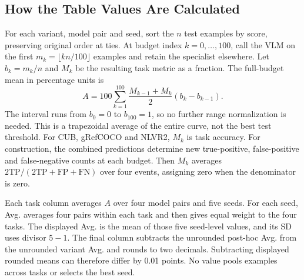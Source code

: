 \subsection{How the Table Values Are Calculated}
For each variant, model pair and seed, sort the $n$ test examples by score, preserving original order at ties. At budget index $k=0,\ldots,100$, call the VLM on the first $m_k=\lfloor kn/100\rfloor$ examples and retain the specialist elsewhere. Let $b_k=m_k/n$ and $M_k$ be the resulting task metric as a fraction. The full-budget mean in percentage units is
\[
A=100\sum_{k=1}^{100}\frac{M_{k-1}+M_k}{2}(b_k-b_{k-1}).
\]
The interval runs from $b_0=0$ to $b_{100}=1$, so no further range normalization is needed. This is a trapezoidal average of the entire curve, not the best test threshold. For CUB, gRefCOCO and NLVR2, $M_k$ is task accuracy. For construction, the combined predictions determine new true-positive, false-positive and false-negative counts at each budget. Then $M_k$ averages $2\mathrm{TP}/(2\mathrm{TP}+\mathrm{FP}+\mathrm{FN})$ over four events, assigning zero when the denominator is zero.

Each task column averages $A$ over four model pairs and five seeds. For each seed, Avg. averages four pairs within each task and then gives equal weight to the four tasks. The displayed Avg. is the mean of those five seed-level values, and its SD uses divisor $5-1$. The final column subtracts the unrounded post-hoc Avg. from the unrounded variant Avg. and rounds to two decimals. Subtracting displayed rounded means can therefore differ by 0.01 points. No value pools examples across tasks or selects the best seed.
